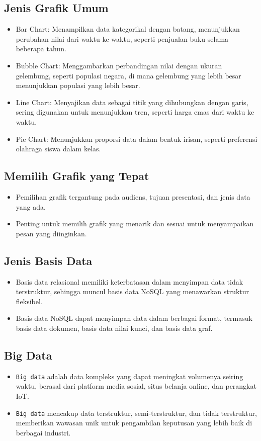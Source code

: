 \documentclass{article}
\begin{document}
\subsection{Jenis Grafik Umum}
\begin{itemize}
    \item Bar Chart: Menampilkan data kategorikal dengan batang, menunjukkan perubahan nilai dari waktu ke waktu, seperti penjualan buku selama beberapa tahun.
    \item Bubble Chart: Menggambarkan perbandingan nilai dengan ukuran gelembung, seperti populasi negara, di mana gelembung yang lebih besar menunjukkan populasi yang lebih besar.
    \item Line Chart: Menyajikan data sebagai titik yang dihubungkan dengan garis, sering digunakan untuk menunjukkan tren, seperti harga emas dari waktu ke waktu.
    \item Pie Chart: Menunjukkan proporsi data dalam bentuk irisan, seperti preferensi olahraga siswa dalam kelas.
\end{itemize}

\subsection{Memilih Grafik yang Tepat}
\begin{itemize}
    \item Pemilihan grafik tergantung pada audiens, tujuan presentasi, dan jenis data yang ada.
    \item Penting untuk memilih grafik yang menarik dan sesuai untuk menyampaikan pesan yang diinginkan.
\end{itemize}

\subsection{Jenis Basis Data}
\begin{itemize}
    \item Basis data relasional memiliki keterbatasan dalam menyimpan data tidak terstruktur, sehingga muncul basis data NoSQL yang menawarkan struktur fleksibel.
    \item Basis data NoSQL dapat menyimpan data dalam berbagai format, termasuk basis data dokumen, basis data nilai kunci, dan basis data graf.
\end{itemize}

\subsection{Big Data}
\begin{itemize}
    \item \texttt{Big data} adalah data kompleks yang dapat meningkat volumenya seiring waktu, berasal dari platform media sosial, situs belanja online, dan perangkat IoT.
    \item \texttt{Big data} mencakup data terstruktur, semi-terstruktur, dan tidak terstruktur, memberikan wawasan unik untuk pengambilan keputusan yang lebih baik di berbagai industri.
\end{itemize}
\end{document}
